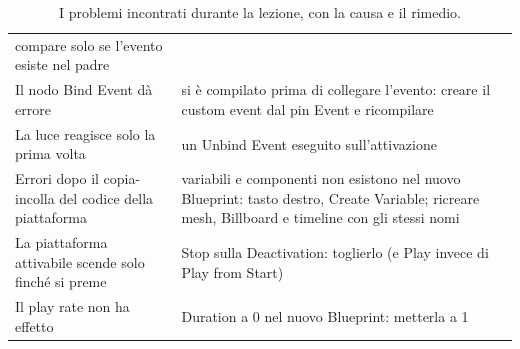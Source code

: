 \begin{table}[htbp]
\begin{tabular}{@{}p{5.4cm}p{8.6cm}@{}}
compare solo se l'evento esiste nel padre \\
Il nodo Bind Event dà errore & si è compilato prima di collegare l'evento: creare il
custom event dal pin Event e ricompilare \\
La luce reagisce solo la prima volta & un Unbind Event eseguito sull'attivazione \\
Errori dopo il copia-incolla del codice della piattaforma & variabili e componenti non
esistono nel nuovo Blueprint: tasto destro, Create Variable; ricreare mesh, Billboard e
timeline con gli stessi nomi \\
La piattaforma attivabile scende solo finché si preme & Stop sulla Deactivation:
toglierlo (e Play invece di Play from Start) \\
Il play rate non ha effetto & Duration a 0 nel nuovo Blueprint: metterla a 1 \\
\bottomrule
\end{tabular}
\caption{I problemi incontrati durante la lezione, con la causa e il rimedio.}
\label{ue7:tab:errori}
\end{table}

